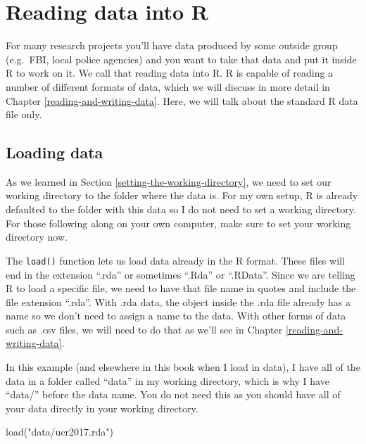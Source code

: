 \documentclass[
]{krantz}
\makeatletter
\newenvironment{Shaded}{\begin{snugshade}}{\end{snugshade}}
\newcommand{\FunctionTok}[1]{\textcolor[rgb]{0,0,0}{#1}}
\newcommand{\NormalTok}[1]{#1}
\newcommand{\StringTok}[1]{\textcolor[rgb]{0.5,0.5,0.5}{#1}}
\newenvironment{kframe}{%
\medskip{}
\setlength{\fboxsep}{.8em}
 \def\at@end@of@kframe{}%
 \ifinner\ifhmode%
  \def\at@end@of@kframe{\end{minipage}}%
  \begin{minipage}{\columnwidth}%
 \fi\fi%
 \def\FrameCommand##1{\hskip\@totalleftmargin \hskip-\fboxsep
 \colorbox{shadecolor}{##1}\hskip-\fboxsep
     \hskip-\linewidth \hskip-\@totalleftmargin \hskip\columnwidth}%
 \MakeFramed {\advance\hsize-\width
   \@totalleftmargin\z@ \linewidth\hsize
   \@setminipage}}%
 {\par\unskip\endMakeFramed%
 \at@end@of@kframe}
\renewenvironment{Shaded}{\begin{kframe}}{\end{kframe}}
\makeatother
\begin{document}
\hypertarget{reading-data-into-r}{%
\section{Reading data into R}\label{reading-data-into-r}}

For many research projects you'll have data produced by some
outside group (e.g.~FBI, local police agencies) and you want
to take that data and put it inside R to work on it. We call
that reading data into R. R is capable of reading a number
of different formats of data, which we will discuss in more
detail in Chapter \ref{reading-and-writing-data}. Here, we
will talk about the standard R data file only.

\hypertarget{loading-data-intro}{%
\subsection{Loading data}\label{loading-data-intro}}

As we learned in Section
\ref{setting-the-working-directory}, we need to set our
working directory to the folder where the data is. For my
own setup, R is already defaulted to the folder with this
data so I do not need to set a working directory. For those
following along on your own computer, make sure to set your
working directory now.

The \texttt{load()} function lets us load data already in
the R format. These files will end in the extension ``.rda''
or sometimes ``.Rda'' or ``.RData''. Since we are telling R
to load a specific file, we need to have that file name in
quotes and include the file extension ``.rda''. With .rda
data, the object inside the .rda file already has a name so
we don't need to assign a name to the data. With other forms
of data such as .csv files, we will need to do that as we'll
see in Chapter \ref{reading-and-writing-data}.

In this example (and elsewhere in this book when I load in
data), I have all of the data in a folder called ``data'' in
my working directory, which is why I have ``data/'' before
the data name. You do not need this as you should have all
of your data directly in your working directory.

\begin{Shaded}
\begin{Highlighting}[]
\FunctionTok{load}\NormalTok{(}\StringTok{"data/ucr2017.rda"}\NormalTok{)}
\end{Highlighting}
\end{Shaded}
\end{document}
